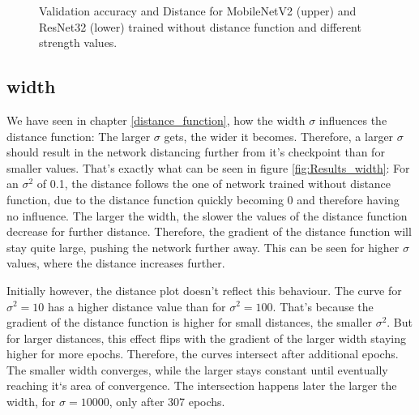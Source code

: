 \begin{figure}[h]
\begin{center}
        \caption{Validation accuracy and Distance for MobileNetV2 (upper) and ResNet32 (lower) trained without distance function and different strength values.}
    \end{center}
\end{figure}

\subsection{width}
We have seen in chapter \ref{distance_function}, how the width $\sigma$
influences the distance function: The larger $\sigma$ gets, the wider it
becomes. Therefore, a larger $\sigma$ should result in the network distancing
further from it's checkpoint than for smaller values. That's exactly what can be
seen in figure \ref{fig:Results_width}: For an $\sigma^2$ of 0.1, the distance
follows the one of network trained without distance function, due to the
distance function quickly becoming 0 and therefore having no influence. The
larger the width, the slower the values of the distance function decrease for further
distance. Therefore, the gradient of the distance function will stay quite
large, pushing the network further away. This can be seen for higher $\sigma$
values, where the distance increases further.


Initially however, the distance plot doesn't reflect this behaviour. The curve
for $\sigma^2 = 10$ has a higher distance value than for $\sigma^2 = 100$.
That's because the gradient of the distance function is higher for small distances, the
smaller $\sigma^2$. But for larger distances, this effect flips with the gradient
of the larger width staying higher for more epochs. Therefore, the curves
intersect after additional epochs. The smaller width converges, while the larger
stays constant until eventually reaching it`s area of convergence. The
intersection happens later the larger the width, for $\sigma = 10000$, only
after 307 epochs.

